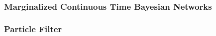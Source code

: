 \subsubsection{Marginalized Continuous Time Bayesian Networks}
%


\subsubsection{Particle Filter}

